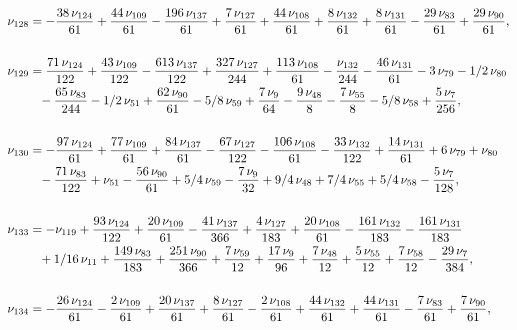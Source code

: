 \documentclass[a4paper,12pt, DIV=14, BCOR=5mm, twoside, headsepline, numbers=noenddot]{scrbook}
\begin{document}
\begin{align}\label{AreaSol12}
\begin{aligned}
\nu_{{128}}&=-{\frac {38\,\nu_{{124}}}{61}}+{\frac {44\,
\nu_{{109}}}{61}}-{\frac {196\,\nu_{{137}}}{61}}+{\frac {7\,\nu_{{127}
}}{61}}+{\frac {44\,\nu_{{108}}}{61}}+{\frac {8\,\nu_{{132}}}{61}}+{
\frac {8\,\nu_{{131}}}{61}}-{\frac {29\,\nu_{{83}}}{61}}+{\frac {29\,
\nu_{{90}}}{61}}, \\
\\
\nu_{{129}}&={\frac {71\,\nu_{{124}}}{122}}+{\frac {43
\,\nu_{{109}}}{122}}-{\frac {613\,\nu_{{137}}}{122}}+{\frac {327\,\nu_
{{127}}}{244}}+{\frac {113\,\nu_{{108}}}{61}}-{\frac {\nu_{{132}}}{244
}}-{\frac {46\,\nu_{{131}}}{61}}-3\,\nu_{{79}}-1/2\,\nu_{{80}}\\
 &\hphantom{=}-{\frac 
{65\,\nu_{{83}}}{244}}-1/2\,\nu_{{51}}+{\frac {62\,\nu_{{90}}}{61}}-5/
8\,\nu_{{59}}+{\frac {7\,\nu_{{9}}}{64}}-{\frac {9\,\nu_{{48}}}{8}}-{
\frac {7\,\nu_{{55}}}{8}}-5/8\,\nu_{{58}}+{\frac {5\,\nu_{{7}}}{256}},\\
\\
\nu_{{130}}&=-{\frac {97\,\nu_{{124}}}{61}}+{\frac {77\,\nu_{{109}}}{61
}}+{\frac {84\,\nu_{{137}}}{61}}-{\frac {67\,\nu_{{127}}}{122}}-{
\frac {106\,\nu_{{108}}}{61}}-{\frac {33\,\nu_{{132}}}{122}}+{\frac {
14\,\nu_{{131}}}{61}}+6\,\nu_{{79}}+\nu_{{80}}\\
 &\hphantom{=}-{\frac {71\,\nu_{{83}}
}{122}}+\nu_{{51}}-{\frac {56\,\nu_{{90}}}{61}}+5/4\,\nu_{{59}}-{
\frac {7\,\nu_{{9}}}{32}}+9/4\,\nu_{{48}}+7/4\,\nu_{{55}}+5/4\,\nu_{{
58}}-{\frac {5\,\nu_{{7}}}{128}}, \\
\\
\nu_{{133}}&=-\nu_{{119}}+{\frac {93\,
\nu_{{124}}}{122}}+{\frac {20\,\nu_{{109}}}{61}}-{\frac {41\,\nu_{{137
}}}{366}}+{\frac {4\,\nu_{{127}}}{183}}+{\frac {20\,\nu_{{108}}}{61}}-
{\frac {161\,\nu_{{132}}}{183}}-{\frac {161\,\nu_{{131}}}{183}}\\
 &\hphantom{=}+1/16\,
\nu_{{11}}+{\frac {149\,\nu_{{83}}}{183}}+{\frac {251\,\nu_{{90}}}{366
}}+{\frac {7\,\nu_{{59}}}{12}}+{\frac {17\,\nu_{{9}}}{96}}+{\frac {7\,
\nu_{{48}}}{12}}+{\frac {5\,\nu_{{55}}}{12}}+{\frac {7\,\nu_{{58}}}{12
}}-{\frac {29\,\nu_{{7}}}{384}}, \\
\\
\nu_{{134}}&=-{\frac {26\,\nu_{{124}}}{
61}}-{\frac {2\,\nu_{{109}}}{61}}+{\frac {20\,\nu_{{137}}}{61}}+{
\frac {8\,\nu_{{127}}}{61}}-{\frac {2\,\nu_{{108}}}{61}}+{\frac {44\,
\nu_{{132}}}{61}}+{\frac {44\,\nu_{{131}}}{61}}-{\frac {7\,\nu_{{83}}
}{61}}+{\frac {7\,\nu_{{90}}}{61}}, \\

\end{aligned}
\end{align}
\end{document}
